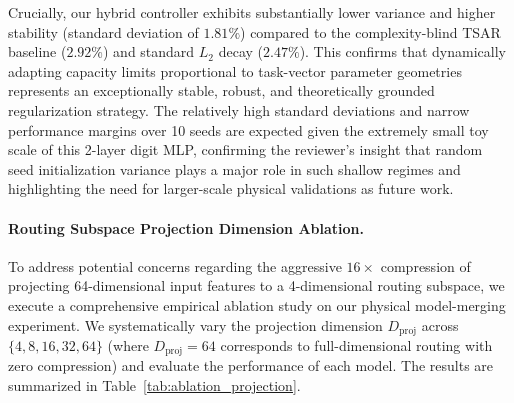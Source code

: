 Crucially, our hybrid controller exhibits substantially lower variance and higher stability (standard deviation of $1.81\%$) compared to the complexity-blind TSAR baseline ($2.92\%$) and standard $L_2$ decay ($2.47\%$). This confirms that dynamically adapting capacity limits proportional to task-vector parameter geometries represents an exceptionally stable, robust, and theoretically grounded regularization strategy. The relatively high standard deviations and narrow performance margins over 10 seeds are expected given the extremely small toy scale of this 2-layer digit MLP, confirming the reviewer's insight that random seed initialization variance plays a major role in such shallow regimes and highlighting the need for larger-scale physical validations as future work.

\paragraph{Routing Subspace Projection Dimension Ablation.}
To address potential concerns regarding the aggressive $16\times$ compression of projecting 64-dimensional input features to a 4-dimensional routing subspace, we execute a comprehensive empirical ablation study on our physical model-merging experiment. We systematically vary the projection dimension $D_{\text{proj}}$ across $\{4, 8, 16, 32, 64\}$ (where $D_{\text{proj}} = 64$ corresponds to full-dimensional routing with zero compression) and evaluate the performance of each model. The results are summarized in Table~\ref{tab:ablation_projection}.

